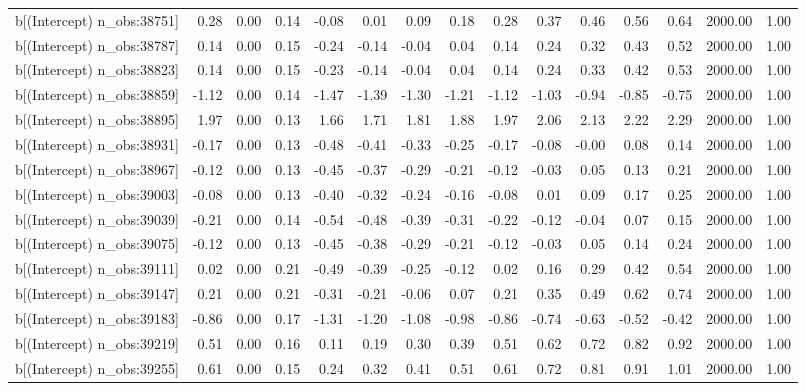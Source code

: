 \begin{table}[ht]
\begin{tabular}{rrrrrrrrrrrrrrr}
  b[(Intercept) n\_obs:38751] & 0.28 & 0.00 & 0.14 & -0.08 & 0.01 & 0.09 & 0.18 & 0.28 & 0.37 & 0.46 & 0.56 & 0.64 & 2000.00 & 1.00 \\ 
  b[(Intercept) n\_obs:38787] & 0.14 & 0.00 & 0.15 & -0.24 & -0.14 & -0.04 & 0.04 & 0.14 & 0.24 & 0.32 & 0.43 & 0.52 & 2000.00 & 1.00 \\ 
  b[(Intercept) n\_obs:38823] & 0.14 & 0.00 & 0.15 & -0.23 & -0.14 & -0.04 & 0.04 & 0.14 & 0.24 & 0.33 & 0.42 & 0.53 & 2000.00 & 1.00 \\ 
  b[(Intercept) n\_obs:38859] & -1.12 & 0.00 & 0.14 & -1.47 & -1.39 & -1.30 & -1.21 & -1.12 & -1.03 & -0.94 & -0.85 & -0.75 & 2000.00 & 1.00 \\ 
  b[(Intercept) n\_obs:38895] & 1.97 & 0.00 & 0.13 & 1.66 & 1.71 & 1.81 & 1.88 & 1.97 & 2.06 & 2.13 & 2.22 & 2.29 & 2000.00 & 1.00 \\ 
  b[(Intercept) n\_obs:38931] & -0.17 & 0.00 & 0.13 & -0.48 & -0.41 & -0.33 & -0.25 & -0.17 & -0.08 & -0.00 & 0.08 & 0.14 & 2000.00 & 1.00 \\ 
  b[(Intercept) n\_obs:38967] & -0.12 & 0.00 & 0.13 & -0.45 & -0.37 & -0.29 & -0.21 & -0.12 & -0.03 & 0.05 & 0.13 & 0.21 & 2000.00 & 1.00 \\ 
  b[(Intercept) n\_obs:39003] & -0.08 & 0.00 & 0.13 & -0.40 & -0.32 & -0.24 & -0.16 & -0.08 & 0.01 & 0.09 & 0.17 & 0.25 & 2000.00 & 1.00 \\ 
  b[(Intercept) n\_obs:39039] & -0.21 & 0.00 & 0.14 & -0.54 & -0.48 & -0.39 & -0.31 & -0.22 & -0.12 & -0.04 & 0.07 & 0.15 & 2000.00 & 1.00 \\ 
  b[(Intercept) n\_obs:39075] & -0.12 & 0.00 & 0.13 & -0.45 & -0.38 & -0.29 & -0.21 & -0.12 & -0.03 & 0.05 & 0.14 & 0.24 & 2000.00 & 1.00 \\ 
  b[(Intercept) n\_obs:39111] & 0.02 & 0.00 & 0.21 & -0.49 & -0.39 & -0.25 & -0.12 & 0.02 & 0.16 & 0.29 & 0.42 & 0.54 & 2000.00 & 1.00 \\ 
  b[(Intercept) n\_obs:39147] & 0.21 & 0.00 & 0.21 & -0.31 & -0.21 & -0.06 & 0.07 & 0.21 & 0.35 & 0.49 & 0.62 & 0.74 & 2000.00 & 1.00 \\ 
  b[(Intercept) n\_obs:39183] & -0.86 & 0.00 & 0.17 & -1.31 & -1.20 & -1.08 & -0.98 & -0.86 & -0.74 & -0.63 & -0.52 & -0.42 & 2000.00 & 1.00 \\ 
  b[(Intercept) n\_obs:39219] & 0.51 & 0.00 & 0.16 & 0.11 & 0.19 & 0.30 & 0.39 & 0.51 & 0.62 & 0.72 & 0.82 & 0.92 & 2000.00 & 1.00 \\ 
  b[(Intercept) n\_obs:39255] & 0.61 & 0.00 & 0.15 & 0.24 & 0.32 & 0.41 & 0.51 & 0.61 & 0.72 & 0.81 & 0.91 & 1.01 & 2000.00 & 1.00 \\ 

\end{tabular}
\end{table}

